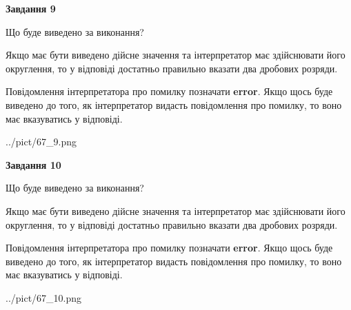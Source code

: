 \documentclass[12pt, ukrainian]{article}
\begin{document}
{\begin {Large}
{\begin {center}\textbf{Завдання 9}\end {center}}\par
Що буде виведено за виконання? \par

Якщо має бути виведено дійсне значення та інтерпретатор має здійснювати його округлення, 
то у відповіді достатньо правильно вказати два дробових розряди.

Повідомлення інтерпретатора про помилку позначати \textbf{error}.
Якщо щось буде виведено до того, як інтерпретатор видасть повідомлення про помилку, 
то воно має вказуватись у відповіді. \par

\begin{center}
	{../pict/67_9.png}
\end{center}
\newpage

{\begin {center}\textbf{Завдання 10}\end {center}}\par
Що буде виведено за виконання? \par

Якщо має бути виведено дійсне значення та інтерпретатор має здійснювати його округлення, 
то у відповіді достатньо правильно вказати два дробових розряди.

Повідомлення інтерпретатора про помилку позначати \textbf{error}.
Якщо щось буде виведено до того, як інтерпретатор видасть повідомлення про помилку, 
то воно має вказуватись у відповіді. \par

\begin{center}
	{../pict/67_10.png}
\end{center}
\newpage

\end {Large}}
\end{document}
